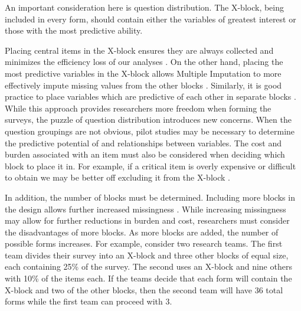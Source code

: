 \documentclass{svjour3}\usepackage[]{graphicx}\usepackage[]{color}
\begin{document}
An important consideration here is question distribution. The X-block, being included in every form, should contain either the variables of greatest interest or those with the most predictive ability.

Placing central items in the X-block ensures they are always collected and minimizes the efficiency loss of our analyses \citep{thomas2006evaluation}. On the other hand, placing the most predictive variables in the X-block allows Multiple Imputation to more effectively impute missing values from the other blocks \citep{gottschall2012comparison}. Similarly, it is good practice to place variables which are predictive of each other in separate blocks \citep{gottschall2012comparison}. While this approach provides researchers more freedom when forming the surveys, the puzzle of question distribution introduces new concerns. When the question groupings are not obvious, pilot studies may be necessary to determine the predictive potential of and relationships between variables. The cost and burden associated with an item must also be considered when deciding which block to place it in. For example, if a critical item is overly expensive or difficult to obtain we may be better off excluding it from the X-block \citep{little2013planned}. \par

In addition, the number of blocks must be determined. Including more blocks in the design allows further increased missingness \citep{graham2006planned}. While increasing missingness may allow for further reductions in burden and cost, researchers must consider the disadvantages of more blocks. As more blocks are added, the number of possible forms increases. For example, consider two research teams. The first team divides their survey into an X-block and three other blocks of equal size, each containing 25\% of the survey. The second uses an X-block and nine others with 10\% of the items each. If the teams decide that each form will contain the X-block and two of the other blocks, then the second team will have 36 total forms while the first team can proceed with 3. 
\end{document}

